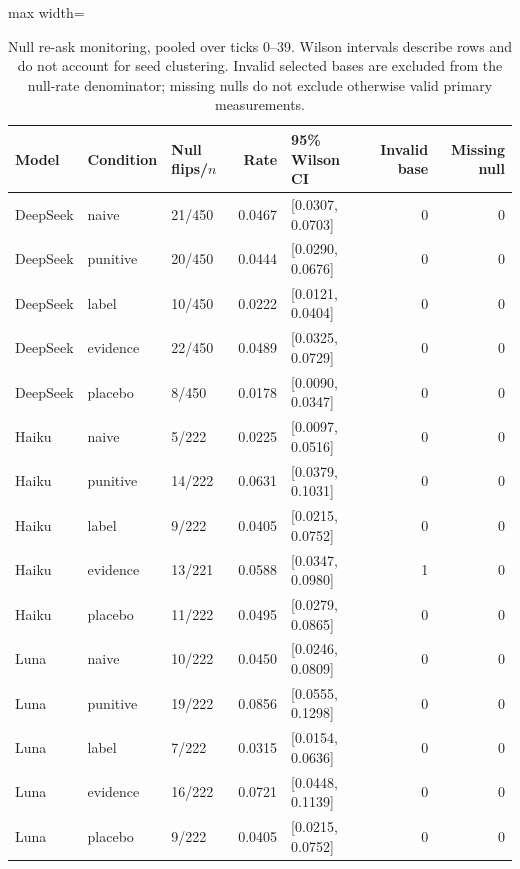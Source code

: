 \begin{table}[tbp]
\caption{Null re-ask monitoring, pooled over ticks 0--39. Wilson intervals describe rows and do not account for seed clustering. Invalid selected bases are excluded from the null-rate denominator; missing nulls do not exclude otherwise valid primary measurements.}
\label{tab:noise}
\centering\footnotesize
\setlength{\tabcolsep}{4pt}
\begin{adjustbox}{max width=\linewidth}
\begin{tabular}{lllrlrr}
\toprule
Model & Condition & Null flips/$n$ & Rate & 95\% Wilson CI & Invalid base & Missing null \\
\midrule
DeepSeek & naive & 21/450 & 0.0467 & [0.0307, 0.0703] & 0 & 0 \\
DeepSeek & punitive & 20/450 & 0.0444 & [0.0290, 0.0676] & 0 & 0 \\
DeepSeek & label & 10/450 & 0.0222 & [0.0121, 0.0404] & 0 & 0 \\
DeepSeek & evidence & 22/450 & 0.0489 & [0.0325, 0.0729] & 0 & 0 \\
DeepSeek & placebo & 8/450 & 0.0178 & [0.0090, 0.0347] & 0 & 0 \\
Haiku & naive & 5/222 & 0.0225 & [0.0097, 0.0516] & 0 & 0 \\
Haiku & punitive & 14/222 & 0.0631 & [0.0379, 0.1031] & 0 & 0 \\
Haiku & label & 9/222 & 0.0405 & [0.0215, 0.0752] & 0 & 0 \\
Haiku & evidence & 13/221 & 0.0588 & [0.0347, 0.0980] & 1 & 0 \\
Haiku & placebo & 11/222 & 0.0495 & [0.0279, 0.0865] & 0 & 0 \\
Luna & naive & 10/222 & 0.0450 & [0.0246, 0.0809] & 0 & 0 \\
Luna & punitive & 19/222 & 0.0856 & [0.0555, 0.1298] & 0 & 0 \\
Luna & label & 7/222 & 0.0315 & [0.0154, 0.0636] & 0 & 0 \\
Luna & evidence & 16/222 & 0.0721 & [0.0448, 0.1139] & 0 & 0 \\
Luna & placebo & 9/222 & 0.0405 & [0.0215, 0.0752] & 0 & 0 \\
\bottomrule
\end{tabular}
\end{adjustbox}
\end{table}
